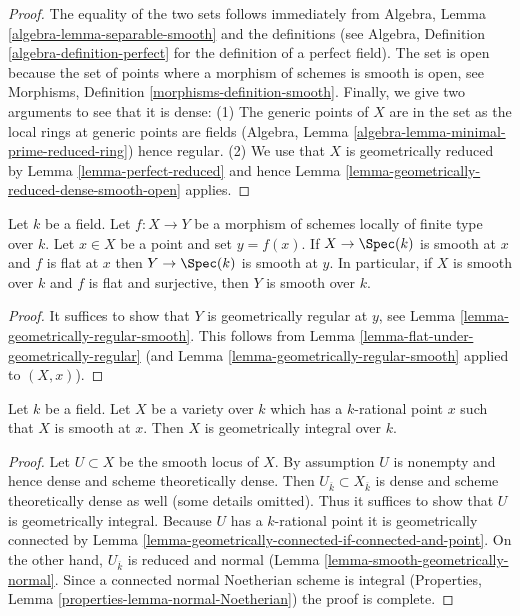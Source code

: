 \begin{proof}
The equality of the two sets follows immediately from
Algebra, Lemma \ref{algebra-lemma-separable-smooth} and the definitions
(see Algebra, Definition \ref{algebra-definition-perfect} for the definition
of a perfect field). The set is open because the set of points where
a morphism of schemes is smooth is open, see
Morphisms, Definition \ref{morphisms-definition-smooth}.
Finally, we give two arguments to see that it is dense:
(1) The generic points of $X$ are in the set as the local rings at
generic points are fields (Algebra, Lemma
\ref{algebra-lemma-minimal-prime-reduced-ring}) hence regular.
(2) We use that $X$ is geometrically reduced by
Lemma \ref{lemma-perfect-reduced} and hence
Lemma \ref{lemma-geometrically-reduced-dense-smooth-open} applies.
\end{proof}

\begin{lemma}
\label{lemma-flat-under-smooth}
Let $k$ be a field. Let $f : X \to Y$ be a morphism of schemes locally
of finite type over $k$. Let $x \in X$ be a point and set $y = f(x)$.
If $X \to \Spec(k)$ is smooth at $x$ and $f$ is flat at $x$
then $Y \to \Spec(k)$ is smooth at $y$. In particular, if $X$ is
smooth over $k$ and $f$ is flat and surjective, then $Y$ is smooth over $k$.
\end{lemma}

\begin{proof}
It suffices to show that $Y$ is geometrically regular at $y$, see
Lemma \ref{lemma-geometrically-regular-smooth}.
This follows from
Lemma \ref{lemma-flat-under-geometrically-regular}
(and
Lemma \ref{lemma-geometrically-regular-smooth}
applied to $(X, x)$).
\end{proof}

\begin{lemma}
\label{lemma-variety-with-smooth-rational-point}
Let $k$ be a field. Let $X$ be a variety over $k$ which has
a $k$-rational point $x$ such that $X$ is smooth at $x$.
Then $X$ is geometrically integral over $k$.
\end{lemma}

\begin{proof}
Let $U \subset X$ be the smooth locus of $X$. By assumption $U$ is nonempty
and hence dense and scheme theoretically dense. Then
$U_{\overline{k}} \subset X_{\overline{k}}$ is dense and
scheme theoretically dense as well (some details omitted).
Thus it suffices to show that $U$ is geometrically integral.
Because $U$ has a $k$-rational point it is geometrically connected
by Lemma \ref{lemma-geometrically-connected-if-connected-and-point}.
On the other hand, $U_{\overline{k}}$ is reduced and normal
(Lemma \ref{lemma-smooth-geometrically-normal}.
Since a connected normal Noetherian scheme
is integral (Properties, Lemma \ref{properties-lemma-normal-Noetherian})
the proof is complete.
\end{proof}

